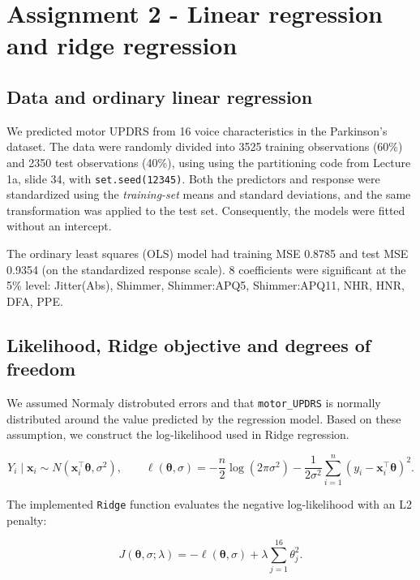 \documentclass[
  english,
  11pt,
]{article}
\begin{document}
\clearpage

\section{Assignment 2 - Linear regression and ridge
regression}\label{assignment-2---linear-regression-and-ridge-regression}

\subsection{Data and ordinary linear
regression}\label{data-and-ordinary-linear-regression}

We predicted motor UPDRS from 16 voice characteristics in the
Parkinson's dataset. The data were randomly divided into 3525 training
observations (60\%) and 2350 test observations (40\%), using using the
partitioning code from Lecture 1a, slide 34, with
\texttt{set.seed(12345)}. Both the predictors and response were
standardized using the \emph{training-set} means and standard
deviations, and the same transformation was applied to the test set.
Consequently, the models were fitted without an intercept.

The ordinary least squares (OLS) model had training MSE 0.8785 and test
MSE 0.9354 (on the standardized response scale). 8 coefficients were
significant at the 5\% level: Jitter(Abs), Shimmer, Shimmer:APQ5,
Shimmer:APQ11, NHR, HNR, DFA, PPE.

\subsection{Likelihood, Ridge objective and degrees of
freedom}\label{likelihood-ridge-objective-and-degrees-of-freedom}

We assumed Normaly distrobuted errors and that \texttt{motor\_UPDRS} is
normally distributed around the value predicted by the regression model.
Based on these assumption, we construct the log-likelihood used in Ridge
regression.

\[
Y_i\mid \mathbf{x}_i \sim N(\mathbf{x}_i^\top\boldsymbol\theta,\sigma^2),
\qquad
\ell(\boldsymbol\theta,\sigma)
=-\frac{n}{2}\log(2\pi\sigma^2)
-\frac{1}{2\sigma^2}\sum_{i=1}^{n}
(y_i-\mathbf{x}_i^\top\boldsymbol\theta)^2.
\]

The implemented \texttt{Ridge} function evaluates the negative
log-likelihood with an L2 penalty:

\[
J(\boldsymbol\theta,\sigma;\lambda)
=-\ell(\boldsymbol\theta,\sigma)
+\lambda\sum_{j=1}^{16}\theta_j^2.
\]
\end{document}
